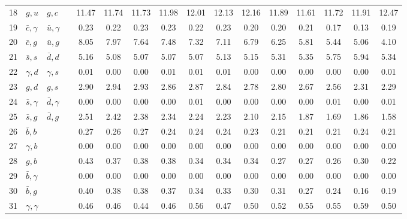 \begin{tabularx}{\textwidth}{rXXX@{}S@{}S@{}S@{}S@{}S@{}S@{}S@{}S@{}S@{}S@{}S@{}S}
 18 & $g,u$            & $g,c$            &                 & 11.47 & 11.74 & 11.73 & 11.98 & 12.01 & 12.13 & 12.16 & 11.89 & 11.61 & 11.72 & 11.91 & 12.47 \\
 19 & $\bar c,\gamma$  & $\bar u,\gamma$  &                 &  0.23 &  0.22 &  0.23 &  0.23 &  0.22 &  0.23 &  0.20 &  0.20 &  0.21 &  0.17 &  0.13 &  0.19 \\
 20 & $\bar c, g$      & $\bar u, g$      &                 &  8.05 &  7.97 &  7.64 &  7.48 &  7.32 &  7.11 &  6.79 &  6.25 &  5.81 &  5.44 &  5.06 &  4.10 \\
 21 & $\bar s, s$      & $\bar d, d$      &                 &  5.16 &  5.08 &  5.07 &  5.07 &  5.07 &  5.13 &  5.15 &  5.31 &  5.35 &  5.75 &  5.94 &  5.34 \\
 22 & $\gamma, d$      & $\gamma, s$      &                 &  0.01 &  0.00 &  0.00 &  0.01 &  0.01 &  0.01 &  0.00 &  0.00 &  0.00 &  0.00 &  0.00 &  0.01 \\
 23 & $g,d$            & $g,s$            &                 &  2.90 &  2.94 &  2.93 &  2.86 &  2.87 &  2.84 &  2.78 &  2.80 &  2.67 &  2.56 &  2.31 &  2.29 \\
 24 & $\bar s,\gamma$  & $\bar d,\gamma$  &                 &  0.00 &  0.00 &  0.00 &  0.00 &  0.01 &  0.00 &  0.00 &  0.00 &  0.00 &  0.01 &  0.00 &  0.01 \\
 25 & $\bar s,g$       & $\bar d, g$      &                 &  2.51 &  2.42 &  2.38 &  2.34 &  2.24 &  2.23 &  2.10 &  2.15 &  1.87 &  1.69 &  1.86 &  1.58 \\
 26 & $\bar b,b$       &                  &                 &  0.27 &  0.26 &  0.27 &  0.24 &  0.24 &  0.24 &  0.23 &  0.21 &  0.21 &  0.21 &  0.24 &  0.21 \\
 27 & $\gamma, b$      &                  &                 &  0.00 &  0.00 &  0.00 &  0.00 &  0.00 &  0.00 &  0.00 &  0.00 &  0.00 &  0.00 &  0.00 &  0.00 \\
 28 & $g,b$            &                  &                 &  0.43 &  0.37 &  0.38 &  0.38 &  0.34 &  0.34 &  0.34 &  0.27 &  0.27 &  0.26 &  0.30 &  0.22 \\
 29 & $\bar b,\gamma$  &                  &                 &  0.00 &  0.00 &  0.00 &  0.00 &  0.00 &  0.00 &  0.00 &  0.00 &  0.00 &  0.00 &  0.00 &  0.00 \\
 30 & $\bar b,g$       &                  &                 &  0.40 &  0.38 &  0.38 &  0.37 &  0.34 &  0.33 &  0.30 &  0.31 &  0.27 &  0.24 &  0.16 &  0.19 \\
 31 & $\gamma,\gamma$  &                  &                 &  0.46 &  0.46 &  0.44 &  0.46 &  0.56 &  0.47 &  0.50 &  0.52 &  0.55 &  0.55 &  0.59 &  0.50 \\

\end{tabularx}
